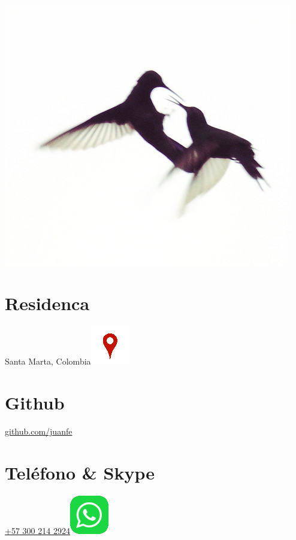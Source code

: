 \begin{aside}
    ~
    ~
    ~
    ~
    ~
    ~
    ~
    ~
  \includegraphics[scale=0.8]{img/coruscan.jpg}
    ~
  \section{Residenca}
    Santa Marta, Colombia\href{https://www.google.com/maps/place/Santa+Marta,+Magdalena/@11.2315666,-74.2030395,14}{\includegraphics[scale=0.15]{img/ubicacion.png}}
    ~
    ~
    ~
  \section{Github}
    \href{https://github.com/juanfe}{github.com/juanfe}
  \section{Teléfono \& Skype}
    \href{callto:+573002142924}{+57 300 214 2924\includegraphics[scale=0.15]{img/whatsapp.png}}
    ~
    ~
    ~
    ~

\end{aside}

